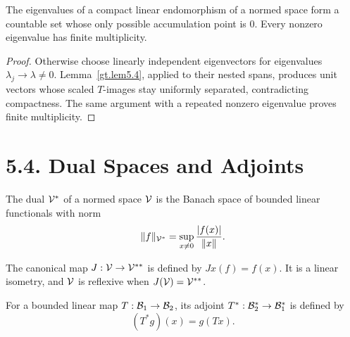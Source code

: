 \begin{theorem}\label{gt.thm5.5}

The eigenvalues of a compact linear endomorphism of a normed space form a
countable set whose only possible accumulation point is $0$. Every nonzero
eigenvalue has finite multiplicity.
\end{theorem}
\begin{proof}
\sketch Otherwise choose linearly independent eigenvectors for eigenvalues
$\lambda_j\to\lambda\neq0$. Lemma~\ref{gt.lem5.4}, applied to their nested
spans, produces unit vectors whose scaled $T$-images stay uniformly
separated, contradicting compactness. The same argument with a repeated
nonzero eigenvalue proves finite multiplicity.
\end{proof}

\section*{5.4. Dual Spaces and Adjoints}

\begin{definition}\label{gt.def5.4.dual-space}

The dual $\mathcal{V}^*$ of a normed space $\mathcal{V}$ is the Banach space of bounded linear
functionals with norm
\begin{equation}\label{gt.eq5.5}
\|f\|_{\mathcal{V}^*}=\sup_{x\neq0}\frac{|f(x)|}{\|x\|}.
\end{equation}
\end{definition}

\begin{definition}\label{gt.def5.4.reflexive}

The canonical map $J:\mathcal{V}\to\mathcal{V}^{**}$ is defined by $Jx(f)=f(x)$. It is a
linear isometry, and $\mathcal{V}$ is reflexive when $J(\mathcal{V})=\mathcal{V}^{**}$.
\end{definition}

\begin{definition}\label{gt.def5.4.adjoint}

For a bounded linear map $T:\mathcal{B}_1\to\mathcal{B}_2$, its adjoint
$T^*:\mathcal{B}_2^*\to\mathcal{B}_1^*$ is defined by
\begin{equation}\label{gt.eq5.6}
(T^*g)(x)=g(Tx).
\end{equation}
\end{definition}

